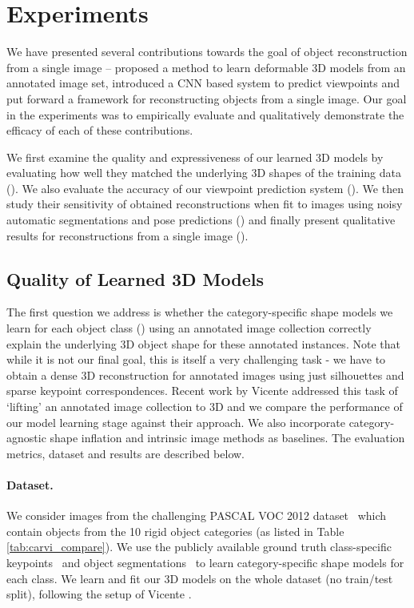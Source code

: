 
\section{Experiments}

We have presented several contributions towards the goal of object reconstruction from a single image --  proposed a method to learn deformable 3D models from an annotated image set,  introduced a CNN based system to predict viewpoints and  put forward a framework for reconstructing objects from a single image. Our goal in the experiments was to empirically evaluate and qualitatively demonstrate the efficacy of each of these contributions.

We first  examine the quality and expressiveness of our learned 3D models by evaluating how well they matched the underlying 3D shapes of the training data (). We also evaluate the accuracy of our viewpoint prediction system (). We then study their sensitivity of obtained reconstructions when fit to images using noisy automatic segmentations and pose predictions () and finally present qualitative results for reconstructions from a single image ().


\subsection{Quality of Learned 3D Models}
The first question we address is whether the category-specific shape models we learn for each object class () using an annotated image collection correctly explain the underlying 3D object shape for these annotated instances. Note that while it is not our final goal, this is itself a very challenging task - we have to obtain a dense 3D reconstruction for annotated images using just silhouettes and sparse keypoint correspondences. Recent work by Vicente \etal \cite{carvi14} addressed this task of `lifting' an annotated image collection to 3D and we compare the performance of our model learning stage against their approach. We also incorporate category-agnostic shape inflation  \cite{twarog2012playing} and intrinsic image \cite{Barron2012B} methods as baselines. The evaluation metrics, dataset and results are described below.


\paragraph{Dataset.} We consider images from the challenging PASCAL VOC 2012 dataset~\cite{pascal-voc-2012} which contain objects from the 10 rigid object categories (as listed in Table \ref{tab:carvi_compare}). We use the publicly available ground truth class-specific keypoints~\cite{bourdevECCV10} and object segmentations~\cite{BharathICCV2011} to learn category-specific shape models for each class. We learn and fit our 3D models on the whole dataset (no train/test split), following the setup of Vicente \etal \cite{carvi14}.

